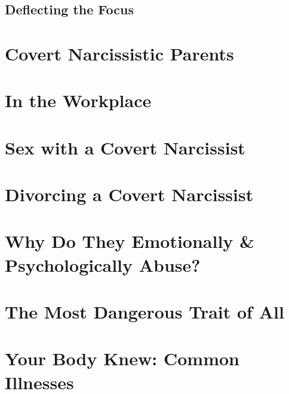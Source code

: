 \documentclass{article}
\numberwithin{equation}{section}
\begin{document}
\subsection{Deflecting the Focus}


\section{Covert Narcissistic Parents}


\section{In the Workplace}


\section{Sex with a Covert Narcissist}


\section{Divorcing a Covert Narcissist}


\section{Why Do They Emotionally \& Psychologically Abuse?}


\section{The Most Dangerous Trait of All}


\section{Your Body Knew: Common Illnesses}
\end{document}
